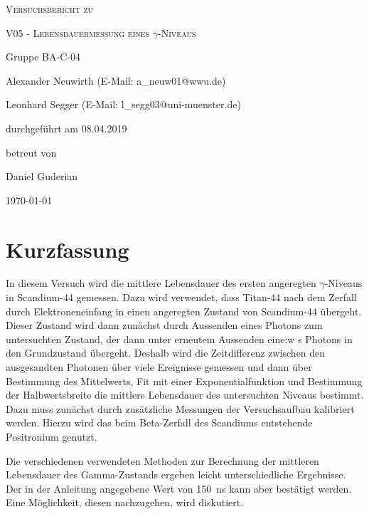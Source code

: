 \documentclass[
	a4paper,
	12pt,
	pagesize,
	ngerman
]{scrartcl}
\begin{document}
	\begin{titlepage}
		\centering
		{\scshape\LARGE Versuchsbericht zu \par}
		\vspace{1cm}
		{\scshape\huge V05 - Lebensdauermessung eines $\gamma$-Niveaus \par}
		\vspace{2.5cm}
		{\LARGE Gruppe BA-C-04 \par}
		\vspace{0.5cm}

		{\large Alexander Neuwirth (E-Mail: a\_neuw01@wwu.de) \par}
		{\large Leonhard Segger (E-Mail: l\_segg03@uni-muenster.de) \par}
		\vfill

		durchgeführt am 08.04.2019\par
		betreut von\par
		{\large Daniel Guderian}
		\vfill

		{\large \today\par}
	\end{titlepage}
	\tableofcontents
	\newpage


	\section{Kurzfassung}
	In diesem Versuch wird die mittlere Lebensdauer des ersten angeregten $\gamma$-Niveaus in Scandium-44 gemessen.
	Dazu wird verwendet, dass Titan-44 nach dem Zerfall durch Elektroneneinfang in einen angeregten Zustand von Scandium-44 übergeht.
	Dieser Zustand wird dann zunächst durch Aussenden eines Photons zum untersuchten Zustand, der dann unter erneutem Aussenden eine:w
	s Photons in den Grundzustand übergeht.
	Deshalb wird die Zeitdifferenz zwischen den ausgesandten Photonen über viele Ereignisse gemessen und dann über Bestimmung des Mittelwerts, Fit mit einer Exponentialfunktion und Bestimmung der Halbwertsbreite die mittlere Lebensdauer des untersuchten Niveaus bestimmt.
	Dazu muss zunächst durch zusätzliche Messungen der Versuchsaufbau kalibriert werden.
	Hierzu wird das beim Beta-Zerfall des Scandiums entstehende Positronium genutzt.

	Die verschiedenen verwendeten Methoden zur Berechnung der mittleren Lebensdauer des Gamma-Zustands ergeben leicht unterschiedliche Ergebnisse.
	Der in der Anleitung angegebene Wert von \SI{150}{\nano s} kann aber bestätigt werden.
	Eine Möglichkeit, diesen nachzugehen, wird diskutiert.
\end{document}
